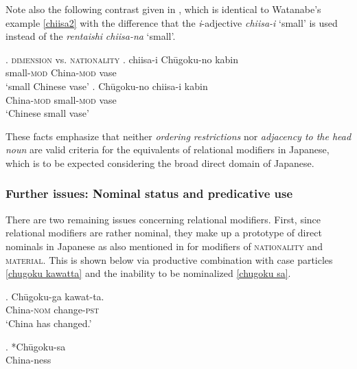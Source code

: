 Note also the following contrast given in \citet{nagano:2016:are}, which is identical to Watanabe’s example \ref{chiisa2} with the difference that the \textit{i}-adjective \textit{chiisa-i} `small’ is used instead of the \textit{rentaishi} \textit{chiisa-na} `small’.

\ex. \textsc{dimension} vs. \textsc{nationality}
\ag. chiisa-i Chūgoku-no kabin\\
small-\textsc{mod} China-\textsc{mod} vase\\
`small Chinese vase'
\bg. Chūgoku-no chiisa-i kabin\\
China-\textsc{mod} small-\textsc{mod} vase\\
`Chinese small vase' \null \hfill \citep[57]{nagano:2016:are}

These facts emphasize that neither \textit{ordering restrictions} nor \textit{adjacency to the head noun} are valid criteria for the equivalents of relational modifiers in Japanese, which is to be expected considering the broad direct domain of Japanese.

\subsubsection{Further issues: Nominal status and predicative use} \label{Ra japanese predicative}

There are two remaining issues concerning relational modifiers. First, since relational modifiers are rather nominal, they make up a prototype of direct nominals in Japanese as also mentioned in \citet{watanabe:2012:direct} for modifiers of \textsc{nationality} and \textsc{material}. This is shown below via productive combination with case particles \ref{chugoku kawatta} and the inability to be nominalized \ref{chugoku sa}.

\exg. Chūgoku-ga kawat-ta.\\
China-\textsc{nom} change-\textsc{pst}\\
`China has changed.’ \label{chugoku kawatta}

\exg. *Chūgoku-sa\\
China-ness \label{chugoku sa}\\


